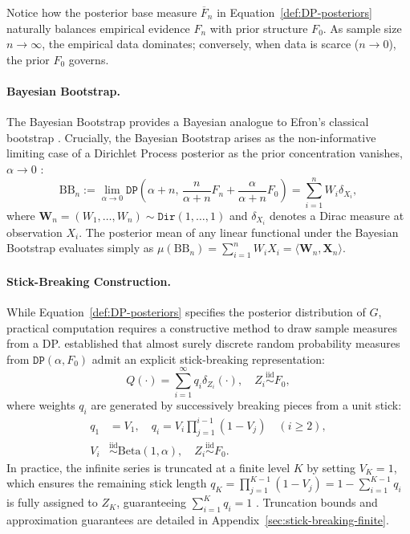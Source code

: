 \documentclass[10pt]{article}
\newcommand{\Dir}{\texttt{Dir}}
\newcommand{\DP}{\texttt{DP}}
\begin{document}
Notice how the posterior base measure $\overline{F}_n$ in Equation~\eqref{def:DP-posteriors} naturally balances empirical evidence $F_n$ with prior structure $F_0$. As sample size $n \to \infty$, the empirical data dominates; conversely, when data is scarce ($n \to 0$), the prior $F_0$ governs.

\paragraph{Bayesian Bootstrap.}
The Bayesian Bootstrap \citep{rubin1981bayesian} provides a Bayesian analogue to Efron's classical bootstrap \citep{efron1994introduction}. Crucially, the Bayesian Bootstrap arises as the non-informative limiting case of a Dirichlet Process posterior as the prior concentration vanishes, $\alpha \to 0$ \citep{ghosal2017fundamentals}:
\begin{equation}\label{def:Bayesian-Bootstrap}
\mathrm{BB}_n := \lim_{\alpha \to 0} \DP\left(\alpha + n, \, \frac{n}{\alpha+n}F_n + \frac{\alpha}{\alpha+n}F_0\right) = \sum_{i=1}^{n} W_{i}\delta_{X_{i}},
\end{equation}
where $\mathbf{W}_n = (W_{1}, \dots, W_{n}) \sim \Dir(1, \dots, 1)$ and $\delta_{X_i}$ denotes a Dirac measure at observation $X_i$. The posterior mean of any linear functional under the Bayesian Bootstrap evaluates simply as $\mu(\mathrm{BB}_n) = \sum_{i=1}^{n} W_{i} X_{i} = \langle \mathbf{W}_n, \mathbf{X}_n \rangle$.

\paragraph{Stick-Breaking Construction.}
While Equation~\eqref{def:DP-posteriors} specifies the posterior distribution of $G$, practical computation requires a constructive method to draw sample measures from a DP. \citet{sethuraman1994constructive} established that almost surely discrete random probability measures from $\DP(\alpha, F_0)$ admit an explicit stick-breaking representation:
\begin{equation}\label{def:Stick-Breaking-priors}
Q(\cdot) = \sum_{i=1}^{\infty} q_{i}\delta_{Z_{i}}(\cdot), \quad Z_i \stackrel{\mathrm{iid}}{\sim} F_0,
\end{equation}
where weights $q_i$ are generated by successively breaking pieces from a unit stick:
\begin{align} 
q_{1} &= V_{1}, \quad q_{i} = V_{i}\prod_{j=1}^{i-1}(1-V_{j}) \quad (i \ge 2), \label{def:SB-DP} \\
V_{i} &\stackrel{\mathrm{iid}}{\sim} \mathrm{Beta}(1,\alpha), \quad Z_{i} \stackrel{\mathrm{iid}}{\sim} F_0. \label{def:SB-DP-3}
\end{align}
In practice, the infinite series is truncated at a finite level $K$ by setting $V_K = 1$, which ensures the remaining stick length $q_K = \prod_{j=1}^{K-1}(1-V_j) = 1 - \sum_{i=1}^{K-1} q_i$ is fully assigned to $Z_K$, guaranteeing $\sum_{i=1}^K q_i = 1$ \citep{ishwaran2001gibbs, muliere1998approximating}. Truncation bounds and approximation guarantees are detailed in Appendix~\ref{sec:stick-breaking-finite}.
\end{document}
